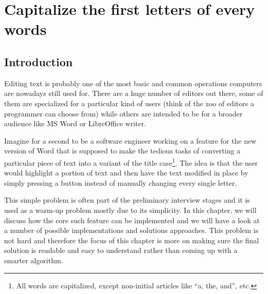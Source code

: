 %

\chapter{Capitalize the first letters of every words}
\label{ch:capitalize_words_first_letter}
\section*{Introduction}
Editing text is probably one of the most basic and common operations computers are nowadays still used for. There are a huge number of editors out there, some of them are specialized for a particular kind of users (think of the zoo of editors a programmer can choose from) while others are intended to be for a broader audience like MS Word or LibreOffice writer. 

Imagine for a second to be a software engineer working on a feature for the new version of Word that is supposed to make the tedious tasks of converting a particular piece of text into a variant of the title case\footnote{All words are capitalized, except non-initial articles like “a, the, and”, etc.}.
The idea is that the user would highlight a portion of text and then have the text modified in place by simply pressing a button instead of manually changing every single letter. 

This simple problem is often part of the preliminary interview stages and it is used as a warm-up problem mostly due to its simplicity. 
In this chapter, we will discuss how the core such feature can be implemented and we will have a look at a number of possible implementations and solutions approaches. This problem is not hard and therefore the focus of this chapter is more on making sure the final solution is readable and easy to understand rather than coming up with a smarter algorithm.

